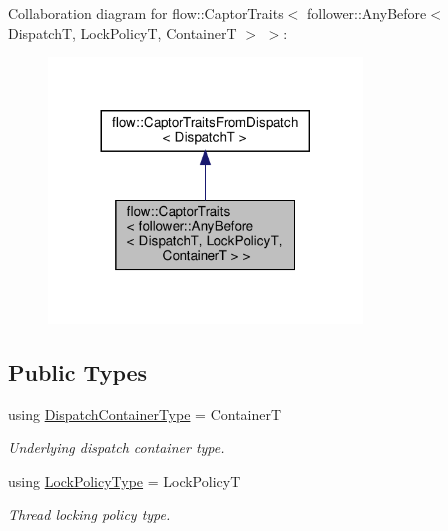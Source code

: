 Collaboration diagram for flow\+:\+:Captor\+Traits$<$ follower\+:\+:Any\+Before$<$ DispatchT, Lock\+PolicyT, ContainerT $>$ $>$\+:
\nopagebreak
\begin{figure}[H]
\begin{center}
\leavevmode
\includegraphics[width=236pt]{structflow_1_1_captor_traits_3_01follower_1_1_any_before_3_01_dispatch_t_00_01_lock_policy_t_00_12a121811c469be4edfce04e073fee80}
\end{center}
\end{figure}
\subsection*{Public Types}
\begin{DoxyCompactItemize}
\item 
\mbox{\label{structflow_1_1_captor_traits_3_01follower_1_1_any_before_3_01_dispatch_t_00_01_lock_policy_t_00_01_container_t_01_4_01_4_ac09d19c0e44905029f3b570bbae450e1}} 
using \hyperlink{structflow_1_1_captor_traits_3_01follower_1_1_any_before_3_01_dispatch_t_00_01_lock_policy_t_00_01_container_t_01_4_01_4_ac09d19c0e44905029f3b570bbae450e1}{Dispatch\+Container\+Type} = ContainerT
\begin{DoxyCompactList}\small\item\em Underlying dispatch container type. \end{DoxyCompactList}\item 
\mbox{\label{structflow_1_1_captor_traits_3_01follower_1_1_any_before_3_01_dispatch_t_00_01_lock_policy_t_00_01_container_t_01_4_01_4_acae0a38175d848686c41a826e88d0c59}} 
using \hyperlink{structflow_1_1_captor_traits_3_01follower_1_1_any_before_3_01_dispatch_t_00_01_lock_policy_t_00_01_container_t_01_4_01_4_acae0a38175d848686c41a826e88d0c59}{Lock\+Policy\+Type} = Lock\+PolicyT
\begin{DoxyCompactList}\small\item\em Thread locking policy type. \end{DoxyCompactList}\end{DoxyCompactItemize}


